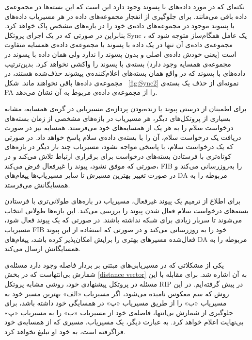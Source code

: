 نکته‌ای که در مورد داده‌های با پسوند  وجود دارد این است که این بسته‌ها در مجموعه‌ی داده باقی می‌مانند. برای جلوگیری از انفجار مجموعه‌های داده در هر مسیریاب داده‌های با پسوند  موجود در مجموعه‌های داده‌ی خود را در بازه‌های مشخص پاک خواهد کرد. بنابراین در صورتی که در یک اجرای پروتکل Sync ، یک عامل همگام‌ساز متوجه شود که مجموعه‌ی داده‌ی آن تنها در یک داده با پسوند  با مجموعه‌ی داده‌ی همسایه متفاوت است (یعنی خودش داده‌ی اصلی و بدون پسوند را ندارد ولی همان داده با پسوند  در مجموعه‌ی همسایه وجود دارد) بسته‌ی با پسوند  را واکشی نخواهد کرد. بدین‌ترتیب داده‌های با پسوند  که در واقع همان بسته‌های اعلام‌کننده‌ی پیشوند حذف‌شده هستند، در مجموعه‌ی داده‌ها باقی نخواهند ماند. شکل ~\ref{fig:Sync2} نمونه‌ای از حذف یک بسته‌ی PA را از مجموعه‌ی داده‌ی مربوط به آن نشان می‌دهد. 



برای اطمینان از درستی پیوند یا زنده‌بودن پردازه‌ی مسیریابی در گره‌ی همسایه، مشابه بسیاری از پروتکل‌های دیگر، هر مسیریاب در بازه‌های مشخصی از زمان بسته‌های درخواست سلام را به هر یک از همسایه‌های خود می‌فرستد. همسایه نیز در صورت دریافت یک درخواست سلام، آن را با بسته‌ی داده‌ی سلام پاسخ خواهد داد. در صورتی که یک درخواست سلام، با پاسخی مواجه نشود، مسیریاب چند بار دیگر در بازه‌های کوتاه‌تری با فرستادن بسته‌های درخواست برای برقراری ارتباط تلاش می‌کند و در صورتی که موفق نشود، پیوند را غیرفعال فرض می‌کند، FIB را به‌روزرسانی می‌کند و در صورت تغییر بهترین مسیرش تا سایر مسیریاب‌ها پیغام‌های DA مربوطه را به همسایگانش می‌فرستد. 

برای اطلاع از ترمیم یک پیوند غیرفعال، مسیریاب در بازه‌های طولانی‌تری با فرستادن بسته‌های درخواست سلام فعال شدن پیوند را بررسی می‌کند. این بازه‌ها طولانی انتخاب می‌شوند تا سربار زیادی برای شبکه نداشته باشند. در صورتی که یک پیوند فعال شود، مسیریاب FIB خود را به روز‌رسانی می‌کند و در صورتی که استفاده از این پیوند فعال‌شده مسیرهای بهتری را برایش امکان‌پذیر کرده باشد، پیغام‌های DA مربوطه را به همسایگانش ارسال می‌کند.


یکی از مشکلاتی که در مسیریابی‌های مبتنی بر بردار فاصله وجود دارد مسئله‌ی شمارش بی‌انتهاست که در بخش \ref{distance vector}‌ به آن اشاره شد. برای مقابله با این مسئله در پروتکل پیشنهادی خود، روشی مشابه پروتکل RIP در پیش گرفته‌ایم. در این روش که سم معکوس نامیده می‌شود، اگر مسیریاب «الف» بهترین مسیر خود به مسیریاب «ب» را از طریق مسیریاب «پ» در همسایگی خود داشته باشد، برای جلوگیری از شمارش بی‌انتها، فاصله‌ی خود از مسیریاب «ب» را به مسیریاب «پ» بی‌نهایت اعلام خواهد کرد. به عبارت دیگر، یک مسیریاب، مسیری که از همسایه‌ی خود فراگرفته است، به خود او تبلیغ نخواهد کرد. 


